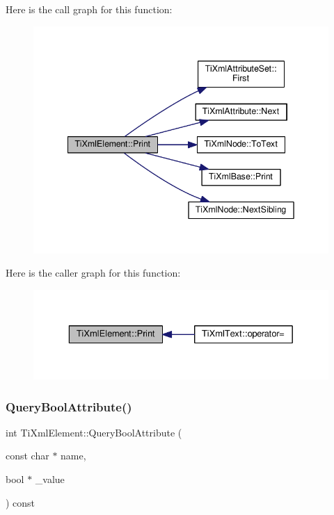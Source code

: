 Here is the call graph for this function\+:
\nopagebreak
\begin{figure}[H]
\begin{center}
\leavevmode
\includegraphics[width=342pt]{class_ti_xml_element_aa31a15cddfb8601a31236fe7d2569fb4_cgraph}
\end{center}
\end{figure}
Here is the caller graph for this function\+:
\nopagebreak
\begin{figure}[H]
\begin{center}
\leavevmode
\includegraphics[width=329pt]{class_ti_xml_element_aa31a15cddfb8601a31236fe7d2569fb4_icgraph}
\end{center}
\end{figure}
\mbox{\label{class_ti_xml_element_a5789b1488af75b6ae37a749700495ceb}} 
\subsubsection{\texorpdfstring{Query\+Bool\+Attribute()}{QueryBoolAttribute()}}
{\footnotesize\ttfamily int Ti\+Xml\+Element\+::\+Query\+Bool\+Attribute (\begin{DoxyParamCaption}\item[{const char $\ast$}]{name,  }\item[{bool $\ast$}]{\+\_\+value }\end{DoxyParamCaption}) const}

